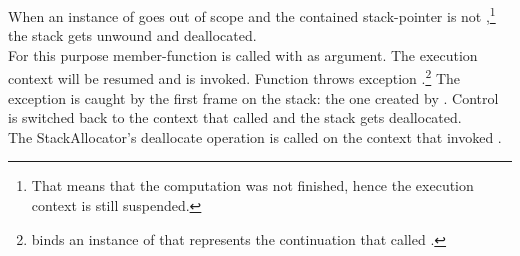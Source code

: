 
When an instance of \cont goes out of scope and the contained stack-pointer is
not \nullptr,\footnote{That means that the computation was not finished, hence
the execution context is still suspended.} the stack gets
unwound and deallocated.\\
For this purpose member-function \resumewith is called with \unwindcont
as argument. The execution context will be
resumed and \unwindcont is invoked. Function \unwindcont throws exception
\unwindex.\footnote{\unwindex binds an instance of \cont that represents the
continuation that called \resumewith.} The exception
is caught by the first frame on the stack: the one created by
\callcc. Control is switched back to the context that called
\dtor and the stack gets deallocated.\\

The StackAllocator's deallocate operation is called on the context that
invoked \dtor.

